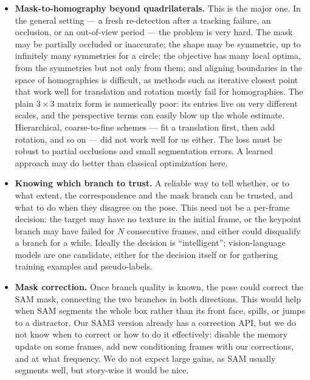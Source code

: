 \documentclass[10pt,twocolumn,letterpaper]{article}
\begin{document}
\begin{itemize}
\item \textbf{Mask-to-homography beyond quadrilaterals.}
This is the major one.
In the general setting --- a fresh re-detection after a tracking failure, an occlusion, or an out-of-view period --- the problem is very hard.
The mask may be partially occluded or inaccurate; the shape may be symmetric, up to infinitely many symmetries for a circle; the objective has many local optima, from the symmetries but not only from them; and aligning boundaries in the space of homographies is difficult, as methods such as iterative closest point that work well for translation and rotation mostly fail for homographies.
The plain $3\times3$ matrix form is numerically poor: its entries live on very different scales, and the perspective terms can easily blow up the whole estimate.
Hierarchical, coarse-to-fine schemes --- fit a translation first, then add rotation, and so on --- did not work well for us either.
The loss must be robust to partial occlusions and small segmentation errors.
A learned approach may do better than classical optimization here.

\item \textbf{Knowing which branch to trust.}
A reliable way to tell whether, or to what extent, the correspondence and the mask branch can be trusted, and what to do when they disagree on the pose.
This need not be a per-frame decision: the target may have no texture in the initial frame, or the keypoint branch may have failed for $N$ consecutive frames, and either could disqualify a branch for a while.
Ideally the decision is ``intelligent''; vision-language models are one candidate, either for the decision itself or for gathering training examples and pseudo-labels.

\item \textbf{Mask correction.}
Once branch quality is known, the pose could correct the SAM mask, connecting the two branches in both directions.
This would help when SAM segments the whole box rather than its front face, spills, or jumps to a distractor.
Our SAM3 version already has a correction API, but we do not know when to correct or how to do it effectively: disable the memory update on some frames, add new conditioning frames with our corrections, and at what frequency.
We do not expect large gains, as SAM usually segments well, but story-wise it would be nice.


\end{itemize}
\end{document}
